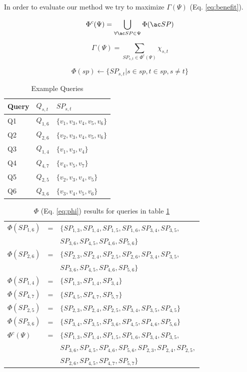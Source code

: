 In order to evaluate our method we try to maximize $\Gamma(\Psi)$ (Eq. \ref{eq:benefit}).



\begin{equation} \label{eq:upsi}
 \Phi^c(\Psi) = \bigcup\limits_{\forall \spath \in \Psi} \Phi(\spath)
\end{equation}

\begin{equation} \label{eq:benefit}
\Gamma(\Psi) = \sum\limits_{SP_{s,t} \in \Phi^c(\Psi)} \chi_{s,t}
\end{equation}

\begin{equation} \label{eq:phi}
\Phi(sp) \leftarrow \{ SP_{s,t} | s \in sp, t \in sp, s \neq t\}
\end{equation}

\begin{table}
\center
\begin{tabular}{|l|l|l|}\hline
Query	&	$Q_{s,t}$	& $SP_{s,t}$ \\\hline 
Q1	&	$Q_{1,6}$ 	& $\{v_1,v_3,v_4,v_5,v_6\}$\\
Q2	&	$Q_{2,6}$ 	& $\{v_2,v_3,v_4,v_5,v_6\}$ \\
Q3	&	$Q_{1,4}$ 	& $\{v_1,v_3,v_4\}$ \\
Q4	&	$Q_{4,7}$ 	& $\{v_4,v_5,v_7\}$ \\
Q5	&	$Q_{2,5}$ 	& $\{v_2,v_3,v_4,v_5\}$ \\
Q6	&	$Q_{3,6}$ 	& $\{v_3,v_4,v_5,v_6\}$ \\\hline
\end{tabular}
\caption{Example Queries}
\label{tab:queries}
\end{table}


\begin{table}
\begin{tabular}{lcp{}}
$\Phi(SP_{1,6})$ &= 	& $\{SP_{1,3},SP_{1,4},SP_{1,5},SP_{1,6},SP_{3,4},SP_{3,5},$\\
		 &	& $SP_{3,6},SP_{4,5},SP_{4,6},SP_{5,6}\}$ \\
$\Phi(SP_{2,6})$ &=  	& $\{SP_{2,3},SP_{2,4},SP_{2,5},SP_{2,6},SP_{3,4},SP_{3,5},$ \\
		 &	& $SP_{3,6},SP_{4,5},SP_{4,6},SP_{5,6}\}$ \\
$\Phi(SP_{1,4})$ &=  	& $\{SP_{1,3},SP_{1,4},SP_{3,4}\}$ \\
$\Phi(SP_{4,7})$ &=  	& $\{SP_{4,5},SP_{4,7},SP_{5,7}\}$ \\
$\Phi(SP_{2,5})$ &=  	& $\{SP_{2,3},SP_{2,4},SP_{2,5},SP_{3,4},SP_{3,5},SP_{4,5}\}$ \\
$\Phi(SP_{3,6})$ &=  	& $\{SP_{3,4},SP_{3,5},SP_{3,6},SP_{4,5},SP_{4,6},SP_{5,6}\}$ \\\hline
$\Phi^c(\Psi)$ 	 &=  	& $\{SP_{1,3},SP_{1,4},SP_{1,5},SP_{1,6},SP_{3,4},SP_{3,5},$ \\
		 &	& $SP_{3,6},SP_{4,5},SP_{4,6},SP_{5,6},SP_{2,3},SP_{2,4},SP_{2,5},$ \\
		 &	& $SP_{2,6},SP_{4,5},SP_{4,7},SP_{5,7}\}$  \\
\end{tabular}
\caption{$\Phi$ (Eq. \ref{eq:phi}) results for queries in table \ref{tab:queries}}
\label{tab:chi}
\end{table}


